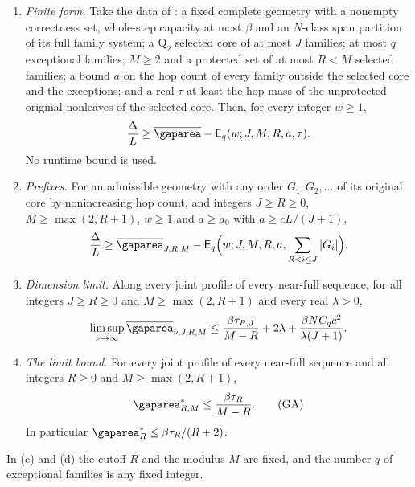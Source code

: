 \begin{theorem}\label{thm:necessary-gap-area}
\begin{enumerate}[label=(\alph*)]
\item \emph{Finite form.} Take the data of \cite[Theorem~3.5]{SourceCovers2026}: a
fixed complete geometry with a nonempty correctness set, whole-step capacity at most
$\beta$ and an $N$-class span partition of its full family system; a $\mathrm Q_2$
selected core of at most $J$ families; at most $q$ exceptional families; $M\ge2$ and a
protected set of at most $R<M$ selected families; a bound $a$ on the hop count of
every family outside the selected core and the exceptions; and a real $\tau$ at least
the hop mass of the unprotected original nonleaves of the selected core. Then, for
every integer $w\ge1$,
\begin{equation}\label{eq:finite-gap-area}
 \frac\Delta L\ge\meanarea-\mathsf E_q(w;J,M,R,a,\tau).
\end{equation}
No runtime bound is used.
\item \emph{Prefixes.} For an admissible geometry with any order $G_1,G_2,\dots$ of its
original core by nonincreasing hop count, and integers $J\ge R\ge0$,
$M\ge\max(2,R+1)$, $w\ge1$ and $a\ge a_0$ with $a\ge cL/(J+1)$,
\[
 \frac\Delta L\ge\meanarea_{J,R,M}
 -\mathsf E_q\Bigl(w;J,M,R,a,\sum_{R<i\le J}|G_i|\Bigr).
\]
\item \emph{Dimension limit.} Along every joint profile of every near-full sequence,
for all integers $J\ge R\ge0$ and $M\ge\max(2,R+1)$ and every real $\lambda>0$,
\[
 \limsup_{\nu\to\infty}\meanarea_{\nu,J,R,M}
 \le\frac{\beta\tau_{R,J}}{M-R}+2\lambda+\frac{\beta NC_qc^2}{\lambda(J+1)}.
\]
\item \emph{The limit bound.} For every joint profile of every near-full sequence and
all integers $R\ge0$ and $M\ge\max(2,R+1)$,
\begin{equation}\label{eq:GA}
 \limarea_{R,M}\le\frac{\beta\tau_R}{M-R}.\tag{GA}
\end{equation}
In particular $\limarea_R\le\beta\tau_R/(R+2)$.
\end{enumerate}
In (c) and (d) the cutoff $R$ and the modulus $M$ are fixed, and the number $q$ of
exceptional families is any fixed integer.
\end{theorem}

